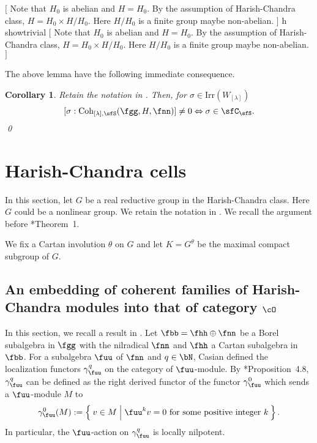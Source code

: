\documentclass[12pt,a4paper]{amsart}
\newcommand{\trivial}[2][]{\if\relax\detokenize{#1}\relax
  {%
      \color{orange} \vspace{0em} $[$  #2 $]$
      \color{black}
  }
  \else
\ifx#1h
\ifcsname showtrivial\endcsname
{%
    \color{orange} \vspace{0em}  $[$ #2 $]$
    \color{black}
}
\fi
\else {\red Wrong argument!} \fi
\fi
}
\numberwithin{equation}{section}
\newtheorem{thm}{Theorem}[section]
\newtheorem{cor}[thm]{Corollary}
\theoremstyle{remark}
\def\Irr{\mathrm{Irr}}
\def\Coh{\mathrm{Coh}}
\def\Spr{\mathrm{Springer}}
\begin{document}
\trivial{
  Note that $H_{0}$ is abelian and $H = H_{0}$.
  By the assumption of Harish-Chandra class,
  $H = H_{0}\times H/H_{0}$. Here $H/H_{0}$ is a finite group maybe non-abelian.
}

The above lemma have the following immediate consequence.
\begin{cor}
  Retain the notation in . Then, for $\sigma\in \Irr(W_{[\lambda]})$
  \[
[\sigma:\Coh_{[\lambda],\sfS}(\fgg,H,\fnn)] \neq 0 \Leftrightarrow
  \sigma\in \sfC_{\sfS}.
  \]   \qed
\end{cor}



\section{Harish-Chandra cells}
In this section, let $G$ be a real reductive group in the Harish-Chandra class.
Here $G$ could be a nonlinear group.
We retain the notation in .
We recall the argument before \cite{Mc}*{Theorem~1}.

We fix a Cartan involution $\theta$ on $G$ and let $K = G^{\theta}$
be the maximal compact subgroup of $G$.



\subsection{An embedding of coherent families of Harish-Chandra modules into
  that of category $\cO$}
In this section, we recall a result in \cite{Cas}. Let $\fbb = \fhh\oplus \fnn$
be a Borel subalgebra in $\fgg$ with the nilradical $\fnn$ and $\fhh$ a Cartan
subalgebra in $\fbb$. For a subalgebra $\fuu$ of $\fnn$ and $q\in \bN$, Casian
defined the localization functors $\gamma_{\fuu}^{q}$ on the category of
$\fuu$-module. By \cite{Cas}*{Proposition~4.8}, $\gamma_{\fuu}^{q}$ can be
defined as the right derived functor of the functor $\gamma_{\fuu}^{0}$ which
sends a $\fuu$-module $M$ to
\[
  \gamma_{\fuu}^{0}(M):= \Set{v\in M| \fuu^{k} v = 0 \text{ for some positive
      integer $k$}}.
\]
In particular, the $\fuu$-action on $\gamma_{\fuu}^{q}$ is locally nilpotent.
\end{document}

